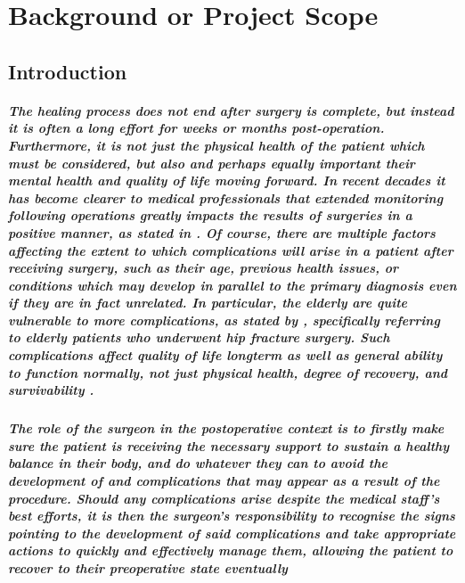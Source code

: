 \chapter{Background or Project Scope}

\section{Introduction}
\paragraph{The healing process does not end after surgery is complete, but instead it is often a long effort for weeks or months post-operation. Furthermore, it is not just the physical health of the patient which must be considered, but also and perhaps equally important their mental health and quality of life moving forward. In recent decades it has become clearer to medical professionals that extended monitoring following operations greatly impacts the results of surgeries in a positive manner, as stated in \cite{d2014defining}. Of course, there are multiple factors affecting the extent to which complications will arise in a patient after receiving surgery, such as their age, previous health issues, or conditions which may develop in parallel to the primary diagnosis even if they are in fact unrelated. In particular, the elderly are quite vulnerable to more complications, as stated by \cite{kare2024post}, specifically referring to elderly patients who underwent hip fracture surgery. Such complications affect quality of life longterm as well as general ability to function normally, not just physical health, degree of recovery, and survivability \cite{kare2024post}.}

\paragraph{The role of the surgeon in the postoperative context is to firstly make sure the patient is receiving the necessary support to sustain a healthy balance in their body, and do whatever they can to avoid the development of and complications that may appear as a result of the procedure. Should any complications arise despite the medical staff's best efforts, it is then the surgeon's responsibility to recognise the signs pointing to the development of said complications and take appropriate actions to quickly and effectively manage them, allowing the patient to recover to their preoperative state eventually \cite{Surwit_Tam_2008}}

